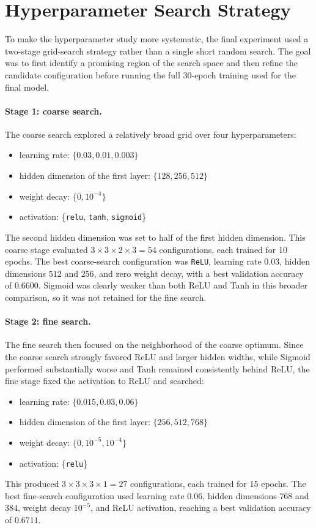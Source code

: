\documentclass{article}
\begin{document}
\section{Hyperparameter Search Strategy}

To make the hyperparameter study more systematic, the final experiment used a two-stage grid-search strategy rather than a single short random search. The goal was to first identify a promising region of the search space and then refine the candidate configuration before running the full 30-epoch training used for the final model.

\paragraph{Stage 1: coarse search.}
The coarse search explored a relatively broad grid over four hyperparameters:
\begin{itemize}
\item learning rate: \(\{0.03, 0.01, 0.003\}\)
\item hidden dimension of the first layer: \(\{128, 256, 512\}\)
\item weight decay: \(\{0, 10^{-4}\}\)
\item activation: \{\texttt{relu}, \texttt{tanh}, \texttt{sigmoid}\}
\end{itemize}
The second hidden dimension was set to half of the first hidden dimension. This coarse stage evaluated \(3 \times 3 \times 2 \times 3 = 54\) configurations, each trained for 10 epochs. The best coarse-search configuration was \texttt{ReLU}, learning rate \(0.03\), hidden dimensions \(512\) and \(256\), and zero weight decay, with a best validation accuracy of \(0.6600\). Sigmoid was clearly weaker than both ReLU and Tanh in this broader comparison, so it was not retained for the fine search.

\paragraph{Stage 2: fine search.}
The fine search then focused on the neighborhood of the coarse optimum. Since the coarse search strongly favored ReLU and larger hidden widths, while Sigmoid performed substantially worse and Tanh remained consistently behind ReLU, the fine stage fixed the activation to ReLU and searched:
\begin{itemize}
\item learning rate: \(\{0.015, 0.03, 0.06\}\)
\item hidden dimension of the first layer: \(\{256, 512, 768\}\)
\item weight decay: \(\{0, 10^{-5}, 10^{-4}\}\)
\item activation: \{\texttt{relu}\}
\end{itemize}
This produced \(3 \times 3 \times 3 \times 1 = 27\) configurations, each trained for 15 epochs. The best fine-search configuration used learning rate \(0.06\), hidden dimensions \(768\) and \(384\), weight decay \(10^{-5}\), and ReLU activation, reaching a best validation accuracy of \(0.6711\).
\end{document}
